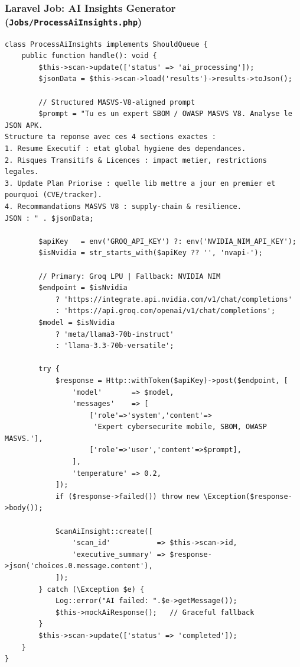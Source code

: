 \documentclass[3p,times]{elsarticle}
\begin{document}
\subsubsection{Laravel Job: AI Insights Generator (\texttt{Jobs/ProcessAiInsights.php})}

\begin{lstlisting}[language=PHP2,
  caption={ProcessAiInsights: Llama 3 70B via Groq API (primary) and NVIDIA NIM (fallback) with OWASP MASVS V8 prompt},
  label={lst:aiinsights}]
class ProcessAiInsights implements ShouldQueue {
    public function handle(): void {
        $this->scan->update(['status' => 'ai_processing']);
        $jsonData = $this->scan->load('results')->results->toJson();

        // Structured MASVS-V8-aligned prompt
        $prompt = "Tu es un expert SBOM / OWASP MASVS V8. Analyse le JSON APK.
Structure ta reponse avec ces 4 sections exactes :
1. Resume Executif : etat global hygiene des dependances.
2. Risques Transitifs & Licences : impact metier, restrictions legales.
3. Update Plan Priorise : quelle lib mettre a jour en premier et pourquoi (CVE/tracker).
4. Recommandations MASVS V8 : supply-chain & resilience.
JSON : " . $jsonData;

        $apiKey   = env('GROQ_API_KEY') ?: env('NVIDIA_NIM_API_KEY');
        $isNvidia = str_starts_with($apiKey ?? '', 'nvapi-');

        // Primary: Groq LPU | Fallback: NVIDIA NIM
        $endpoint = $isNvidia
            ? 'https://integrate.api.nvidia.com/v1/chat/completions'
            : 'https://api.groq.com/openai/v1/chat/completions';
        $model = $isNvidia
            ? 'meta/llama3-70b-instruct'
            : 'llama-3.3-70b-versatile';

        try {
            $response = Http::withToken($apiKey)->post($endpoint, [
                'model'       => $model,
                'messages'    => [
                    ['role'=>'system','content'=>
                     'Expert cybersecurite mobile, SBOM, OWASP MASVS.'],
                    ['role'=>'user','content'=>$prompt],
                ],
                'temperature' => 0.2,
            ]);
            if ($response->failed()) throw new \Exception($response->body());

            ScanAiInsight::create([
                'scan_id'           => $this->scan->id,
                'executive_summary' => $response->json('choices.0.message.content'),
            ]);
        } catch (\Exception $e) {
            Log::error("AI failed: ".$e->getMessage());
            $this->mockAiResponse();   // Graceful fallback
        }
        $this->scan->update(['status' => 'completed']);
    }
}
\end{lstlisting}
\end{document}
